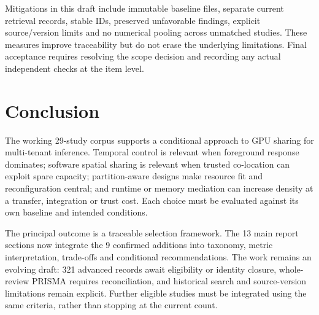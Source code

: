 Mitigations in this draft include immutable baseline files, separate current retrieval records, stable IDs, preserved unfavorable findings, explicit source/version limits and no numerical pooling across unmatched studies. These measures improve traceability but do not erase the underlying limitations. Final acceptance requires resolving the scope decision and recording any actual independent checks at the item level.

\section{Conclusion}
The working 29-study corpus supports a conditional approach to GPU sharing for multi-tenant inference. Temporal control is relevant when foreground response dominates; software spatial sharing is relevant when trusted co-location can exploit spare capacity; partition-aware designs make resource fit and reconfiguration central; and runtime or memory mediation can increase density at a transfer, integration or trust cost. Each choice must be evaluated against its own baseline and intended conditions.

The principal outcome is a traceable selection framework. The 13 main report sections now integrate the 9 confirmed additions into taxonomy, metric interpretation, trade-offs and conditional recommendations. The work remains an evolving draft: 321 advanced records await eligibility or identity closure, whole-review PRISMA requires reconciliation, and historical search and source-version limitations remain explicit. Further eligible studies must be integrated using the same criteria, rather than stopping at the current count.
